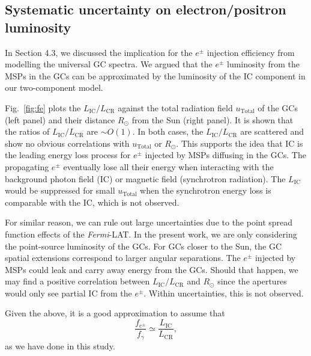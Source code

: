\documentclass[doublespace,draft,nopageskip]{VTthesis} %
\begin{document}
\begin{appendices}
\clearpage

\section{Systematic uncertainty on electron/positron luminosity }\label{appx:system_fe}

In Section 4.3, we discussed the implication for the $e^\pm$ injection efficiency from modelling the universal GC spectra. We argued that the $e^\pm$ luminosity from the MSPs in the GCs can be approximated by the luminosity of the IC component in our two-component model. 

Fig.~\ref{fig:fe} plots the $L_\mathrm{IC}/L_\mathrm{CR}$ against the total radiation field $u_\mathrm{Total}$ of the GCs (left panel) and their distance $R_\odot$ from the Sun (right panel). It is shown that the ratios of $L_\mathrm{IC}/L_\mathrm{CR}$ are $\sim O(1)$. In both cases, the $L_\mathrm{IC}/L_\mathrm{CR}$ are scattered and show no obvious correlations with $u_\mathrm{Total}$ or $R_\odot$. This supports the idea that IC is the leading energy loss process for $e^\pm$ injected by MSPs diffusing in the GCs. The propagating $e^\pm$ eventually lose all their energy when interacting with the background photon field (IC) or magnetic field (synchrotron radiation). The $L_\mathrm{IC}$ would be suppressed for small $u_\mathrm{Total}$ when the synchrotron energy loss is comparable with the IC, which is not observed. 

For similar reason, we can rule out large uncertainties due to the point spread function effects of the \textit{Fermi}-LAT. In the present work, we are only considering the point-source luminosity of the GCs. For GCs closer to the Sun, the GC spatial extensions correspond to larger angular separations. The $e^\pm$ injected by MSPs could leak and carry away energy from the GCs. Should that happen, we may find a positive correlation between $L_\mathrm{IC}/L_\mathrm{CR}$ and $R_\odot$ since the apertures would only see partial IC from the $e^\pm$. Within uncertainties, this is not observed.

Given the above, it is a good approximation to assume that
\begin{equation}
    \dfrac{f_{e^\pm}}{f_\gamma} \simeq \dfrac{L_\mathrm{IC}}{L_\mathrm{CR}},
\end{equation}
as we have done in this study. 


\end{appendices}
\end{document}
